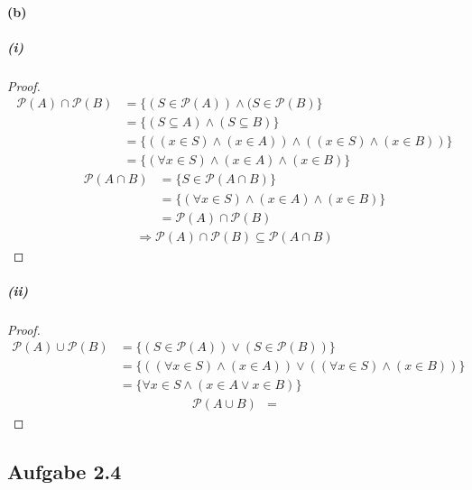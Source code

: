\paragraph{(b)}

\subparagraph{(i)}
\begin{proof}
$ $\newline
\begin{align}
\mathcal{P}(A)\cap\mathcal{P}(B)&=\{(S\in\mathcal{P}(A))\wedge(S\in\mathcal{P}(B)\}\\
&=\{(S\subseteq A)\wedge(S\subseteq B)\}\\
&=\{((x\in S)\wedge(x\in A))\wedge((x\in S)\wedge(x\in B))\}\\
&=\{(\forall x\in S)\wedge(x\in A)\wedge(x\in B)\}
\end{align}
\begin{align}
\mathcal{P}(A\cap B)&=\{S\in\mathcal{P}(A\cap B)\}\\
&=\{(\forall x\in S)\wedge(x\in A)\wedge(x\in B)\}\\
&=\mathcal{P}(A)\cap\mathcal{P}(B)
\end{align}
\begin{align}
\Rightarrow \mathcal{P}(A)\cap\mathcal{P}(B)\subseteq\mathcal{P}(A\cap B)
\end{align}
\end{proof}

\newpage

\subparagraph{(ii)}
\begin{proof}
$ $\newline
\begin{align}
\mathcal{P}(A)\cup\mathcal{P}(B)&=\{(S\in\mathcal{P}(A))\vee(S\in\mathcal{P}(B))\}\\
&=\{((\forall x\in S)\wedge(x\in A))\vee((\forall x\in S)\wedge(x\in B))\}\\
&=\{\forall x\in S\wedge(x\in A\vee x\in B)\}
\end{align}
\begin{align}
\mathcal{P}(A\cup B)&=
\end{align}
\end{proof}

\newpage

\subsection{Aufgabe 2.4}

